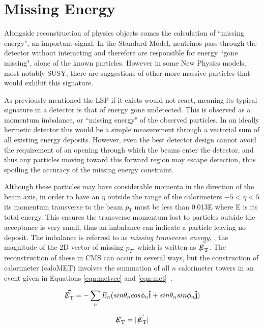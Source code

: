\section{Missing Energy}

Alongside reconstruction of physics objects comes the calculation of ``missing energy", an important signal. In the Standard Model, neutrinos pass through the detector without interacting and therefore are responsible for energy ``gone missing", alone of the known particles. However in some New Physics models, most notably SUSY, there are suggestions of other more massive particles that would exhibit this signature. 
 
As previously mentioned the LSP if it exists would not react, meaning its typical signature in a detector is that of energy gone undetected. This is observed as a momentum imbalance, or ``missing energy" of the observed particles. In an ideally hermetic detector this would be a simple measurement through a vectorial sum of all existing energy deposits. However, even the best detector design cannot avoid the requirement of an opening through which the beams enter the detector, and thus any particles moving toward this forward region may escape detection, thus spoiling the accuracy of the missing energy constraint. 

Although these particles may have considerable momenta in the direction of the beam axis, in order to have an $\eta$ outside the range of the calorimeters $ -5 < \eta < 5$ its momentum transverse to the beam $p_{T}$ must be less than 0.013E where E is its total energy. This ensures the transverse momentum lost to particles outside the acceptance is very small, thus an imbalance can indicate a particle leaving no deposit. The imbalance is referred to as \textit{missing transverse energy}, \met, the magnitude of the 2D vector of missing $p_{T}$, which is written as $\vec{\met}$. The reconstruction of these in CMS can occur in several ways, but the construction of calorimeter \met  (caloMET) involves the summation of all $n$ calorimeter towers in an event given in Equations \ref{eqn:metvec} and \ref{eqn:met}~\cite{metrecon}. 

\begin{equation}
\vec{\met} = - \sum_{n} E_{n} (sin \theta_{n} cos \phi_{n} \mathbf{\hat{i}} + sin \theta_{n} sin \phi_{n}  \mathbf{\hat{j}})
\label{eqn:metvec}
\end{equation}

\begin{equation}
\met = | \vec{\met} | 
\label{eqn:met}
\end{equation}

